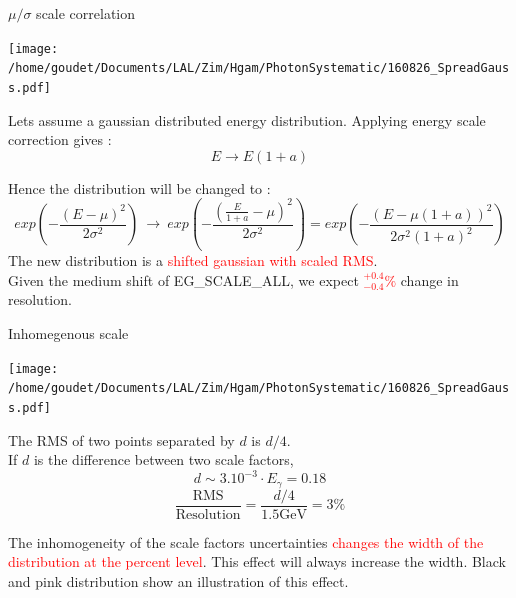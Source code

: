 \begin{frame}{$\mu /\sigma$ scale correlation}
  \begin{minipage}{0.49\linewidth}\texttt{[image: /home/goudet/Documents/LAL/Zim/Hgam/PhotonSystematic/160826\_SpreadGauss.pdf]}\end{minipage}
  \hfill
  \begin{minipage}{0.49\linewidth}
    Lets assume a gaussian distributed energy distribution.
    Applying energy scale correction gives : $$E\rightarrow E(1+a)$$

  \end{minipage}
      Hence the distribution will be changed to  :
      \begin{equation}
      exp( -\frac{(E-\mu)^2}{2\sigma^2} ) \
      \rightarrow\
      exp( -\frac{(\frac{E}{1+a}-\mu)^2}{2\sigma^2})
      =
      exp( -\frac{(E-\mu(1+a))^2}{2\sigma^2(1+a)^2})
    \end{equation}
      The new distribution is a \textcolor{red}{shifted gaussian with scaled RMS}.\\
      Given the medium shift of EG\_SCALE\_ALL, we expect \textcolor{red}{$^{+0.4}_{-0.4}\%$} change in resolution.
\end{frame}


\begin{frame}{Inhomegenous scale}
  \begin{minipage}{0.49\linewidth}\texttt{[image: /home/goudet/Documents/LAL/Zim/Hgam/PhotonSystematic/160826\_SpreadGauss.pdf]}\end{minipage}
  \hfill
  \begin{minipage}{0.49\linewidth}
    The RMS of two points separated by $d$ is $d/4$.\\
    If $d$ is the difference between two scale factors, $$d\sim 3.10^{-3} \cdot E_\gamma=0.18$$
   $$\frac{\text{RMS}}{\text{Resolution}} = \frac{d/4}{1.5\text{GeV}} = 3\%$$
  \end{minipage}
\vfill
  The inhomogeneity of the scale factors uncertainties \textcolor{red}{changes the width of the distribution at the percent level}.
  This effect will always increase the width.  
  \vfill
  Black and pink distribution show an illustration of this effect.
\end{frame}


